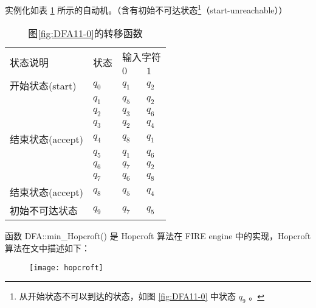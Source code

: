 实例化如表 \ref{tab:DFA411-1} 所示的自动机。（含有初始不可达状态\footnote{从开始状态不可以到达的状态，如图 \ref{fig:DFA11-0} 中状态 $q_9$ 。}（start-unreachable））

\begin{table}[!htbp]
    \caption{图\ref{fig:DFA11-0}的转移函数}
    \label{tab:DFA411-1}
    \centering
    \small%
    \setlength{\tabcolsep}{4pt}%
    \renewcommand{\arraystretch}{1.2}%
        \begin{tabular}{l p{4em}<{\centering} p{3em}<{\centering} p{3em}<{\centering}}
        \toprule %
        \multirow{2}{*}{状态说明} & \multirow{2}{*}{状态} & \multicolumn{2}{c}{输入字符} \\
		\cline{3-4}      &    &$0$ & $1$  \\
        \midrule%
        开始状态(start)  & $q_0$ & $q_1$   & $q_2$   \\
                        & $q_1$ & $q_5$   & $q_2$   \\
                        & $q_2$ & $q_3$   & $q_6$   \\
                        & $q_3$ & $q_2$   & $q_4$   \\
        结束状态(accept) & $q_4$ & $q_8$   & $q_1$   \\
                        & $q_5$ & $q_1$   & $q_6$   \\
                        & $q_6$ & $q_7$   & $q_2$   \\
                        & $q_7$ & $q_6$   & $q_8$   \\
        结束状态(accept) & $q_8$ & $q_5$   & $q_4$   \\
        初始不可达状态    & $q_9$ & $q_7$   & $q_5$   \\
        \bottomrule%
    \end{tabular}
\end{table}

函数 DFA::min\_Hopcroft() 是 Hopcroft 算法在 FIRE engine 中的实现，Hopcroft 算法在文中\cite{watson1993taxonomyb}描述如下：
\begin{figure}[!htbp]
    \centering
        \texttt{[image: hopcroft]}
\end{figure}

